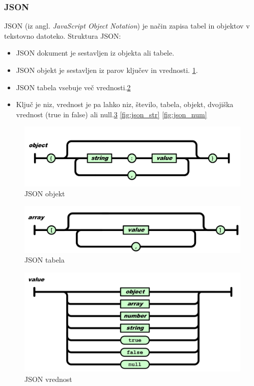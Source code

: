 \documentclass[12pt,titlepage]{report}
\begin{document}
			\subsubsection{JSON\cite{json}}
				JSON (iz angl. \emph{JavaScript Object Notation}) je način zapisa tabel in objektov v tekstovno datoteko.
				Struktura JSON:\cite{json}
				\begin{itemize}
					\item JSON dokument je sestavljen iz objekta ali tabele.
					\item JSON objekt je sestavljen iz parov ključev in vrednosti. \ref{fig:json_obj}.
					\item JSON tabela vsebuje več vrednosti.\ref{fig:json_arr}
					\item Ključ je niz, vrednost je pa lahko niz, število, tabela, objekt, dvojiška vrednost (true in false) ali null.\ref{fig:json_val} \ref{fig:json_str} \ref{fig:json_num}
				\end{itemize}
			\begin{figure}[H]
				\centering
				\includegraphics[width=\textwidth]{json_object.png}
				\caption{JSON objekt\cite{ecma404}}
				\label{fig:json_obj}
			\end{figure}
			\begin{figure}[H]
				\centering
				\includegraphics[width=\textwidth]{json_array.png}
				\caption{JSON tabela\cite{ecma404}}
				\label{fig:json_arr}
			\end{figure}
			\begin{figure}[H]
				\centering
				\includegraphics[width=\textwidth]{json_value.png}
				\caption{JSON vrednost\cite{ecma404}}
				\label{fig:json_val}
			\end{figure}
\end{document}
